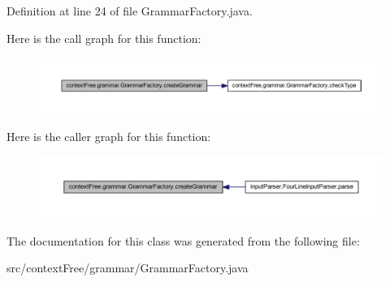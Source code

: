 Definition at line 24 of file Grammar\-Factory.\-java.



Here is the call graph for this function\-:\nopagebreak
\begin{figure}[H]
\begin{center}
\leavevmode
\includegraphics[width=350pt]{classcontext_free_1_1grammar_1_1_grammar_factory_a25d4e5bf4a9a452efca5dd6518e16c25_cgraph}
\end{center}
\end{figure}




Here is the caller graph for this function\-:\nopagebreak
\begin{figure}[H]
\begin{center}
\leavevmode
\includegraphics[width=350pt]{classcontext_free_1_1grammar_1_1_grammar_factory_a25d4e5bf4a9a452efca5dd6518e16c25_icgraph}
\end{center}
\end{figure}




The documentation for this class was generated from the following file\-:\begin{DoxyCompactItemize}
\item 
src/context\-Free/grammar/Grammar\-Factory.\-java\end{DoxyCompactItemize}
